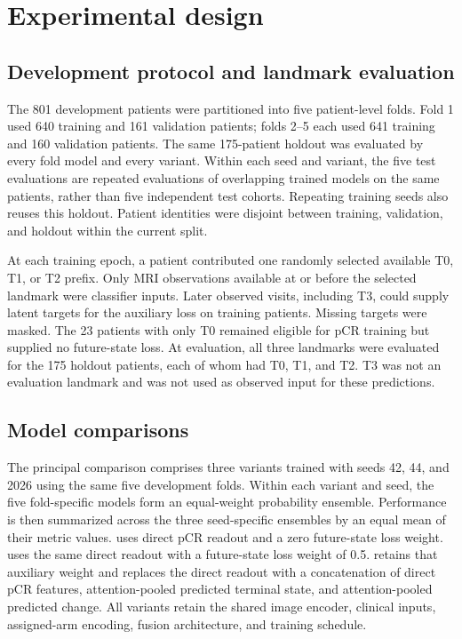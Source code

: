\section{Experimental design}
\label{sec:experiments}
\subsection{Development protocol and landmark evaluation}
The 801 development patients were partitioned into five patient-level folds. Fold 1 used 640 training and 161 validation patients; folds 2--5 each used 641 training and 160 validation patients. The same 175-patient holdout was evaluated by every fold model and every variant. Within each seed and variant, the five test evaluations are repeated evaluations of overlapping trained models on the same patients, rather than five independent test cohorts. Repeating training seeds also reuses this holdout. Patient identities were disjoint between training, validation, and holdout within the current split.

At each training epoch, a patient contributed one randomly selected available T0, T1, or T2 prefix. Only MRI observations available at or before the selected landmark were classifier inputs. Later observed visits, including T3, could supply latent targets for the auxiliary loss on training patients. Missing targets were masked. The 23 patients with only T0 remained eligible for pCR training but supplied no future-state loss. At evaluation, all three landmarks were evaluated for the 175 holdout patients, each of whom had T0, T1, and T2. T3 was not an evaluation landmark and was not used as observed input for these predictions.

\subsection{Model comparisons}
The principal comparison comprises three variants trained with seeds 42, 44, and 2026 using the same five development folds. Within each variant and seed, the five fold-specific models form an equal-weight probability ensemble. Performance is then summarized across the three seed-specific ensembles by an equal mean of their metric values. \nojepa{} uses direct pCR readout and a zero future-state loss weight. \direct{} uses the same direct readout with a future-state loss weight of 0.5. \fullmodel{} retains that auxiliary weight and replaces the direct readout with a concatenation of direct pCR features, attention-pooled predicted terminal state, and attention-pooled predicted change. All variants retain the shared image encoder, clinical inputs, assigned-arm encoding, fusion architecture, and training schedule.

